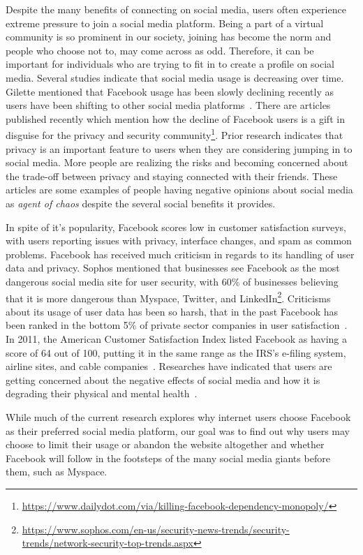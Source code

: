 Despite the many benefits of connecting on social media, users often experience extreme pressure to join a social media platform. Being a part of a virtual community is so prominent in our society, joining has become the norm and people who choose not to, may come across as odd. Therefore, it can be important for individuals who are trying to fit in to create a profile on social media. Several studies indicate that social media usage is decreasing over time. Gilette mentioned that Facebook usage has been slowly declining recently as users have been shifting to other social media platforms~\cite{gillette2015facebook}. There are articles published recently which mention how the decline of Facebook users is a gift in disguise for the privacy and security community\footnote{\url{https://www.dailydot.com/via/killing-facebook-dependency-monopoly/}}. Prior research indicates that privacy is an important feature to users when they are considering jumping in to social media. More people are realizing the risks and becoming concerned about the trade-off between privacy and staying connected with their friends. These articles are some examples of people having negative opinions about social media as \textit{agent of chaos} despite the several social benefits it provides.

In spite of it's popularity, Facebook scores low in customer satisfaction surveys, with users reporting issues with privacy, interface changes, and spam as common problems. Facebook has received much criticism in regards to its handling of user data and privacy. Sophos mentioned that businesses see Facebook as the most dangerous social media site for user security, with 60\% of businesses believing that it is more dangerous than Myspace, Twitter, and LinkedIn\footnote{\url{https://www.sophos.com/en-us/security-news-trends/security-trends/network-security-top-trends.aspx}}. Criticisms about its usage of user data has been so harsh, that in the past Facebook has been ranked in the bottom 5\% of private sector companies in user satisfaction~\cite{greenwood2016social}. In 2011, the American Customer Satisfaction Index listed Facebook as having a score of 64 out of 100, putting it in the same range as the IRS's e-filing system, airline sites, and cable companies~\cite{guynn_2014}. Researches have indicated that users are getting concerned about the negative effects of social media and how it is degrading their physical and mental health~\cite{newyorktimes2017}.

While much of the current research explores why internet users choose Facebook as their preferred social media platform, our goal was to find out why users may choose to limit their usage or abandon the website altogether and whether Facebook will follow in the footsteps of the many social media giants before them, such as Myspace.

